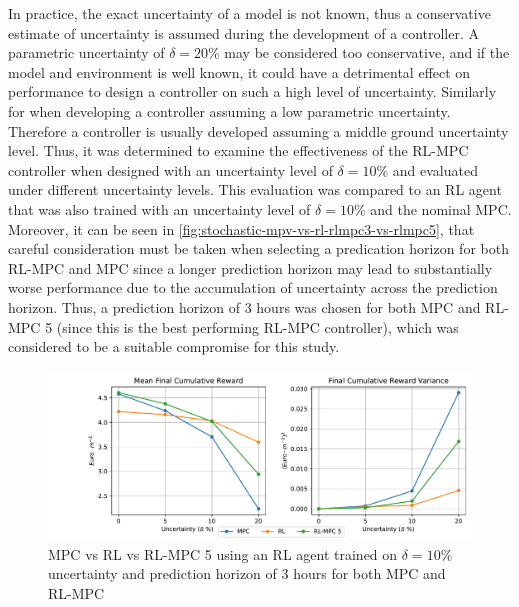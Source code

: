 In practice, the exact uncertainty of a model is not known, thus a conservative estimate of uncertainty is assumed during the development of a controller. A parametric uncertainty of $\delta = 20\%$ may be considered too conservative, and if the model and environment is well known, it could have a detrimental effect on performance to design a controller on such a high level of uncertainty. Similarly for when developing a controller assuming a low parametric uncertainty. Therefore a controller is usually developed assuming a middle ground uncertainty level. Thus, it was determined to examine the effectiveness of the RL-MPC controller when designed with an uncertainty level of $\delta = 10\%$ and evaluated under different uncertainty levels. This evaluation was compared to an RL agent that was also trained with an uncertainty level of $\delta = 10\%$ and the nominal MPC. Moreover, it can be seen in \autoref{fig:stochastic-mpv-vs-rl-rlmpc3-vs-rlmpc5}, that careful consideration must be taken when selecting a predication horizon for both RL-MPC and MPC since a longer prediction horizon may lead to substantially worse performance due to the accumulation of uncertainty across the prediction horizon. Thus, a prediction horizon of 3 hours was chosen for both  MPC and RL-MPC 5 (since this is the best performing RL-MPC controller), which was considered to be a suitable compromise for this study.



\begin{figure}[H]
	\centering
	\includegraphics[width=\textwidth]{figures/stochastic_realife.pdf}
	\caption{MPC vs RL vs RL-MPC 5 using an RL agent trained on $\delta = 10\%$ uncertainty and prediction horizon of 3 hours for both MPC and RL-MPC}
	\label{fig:stochastic-reallife}
\end{figure}

